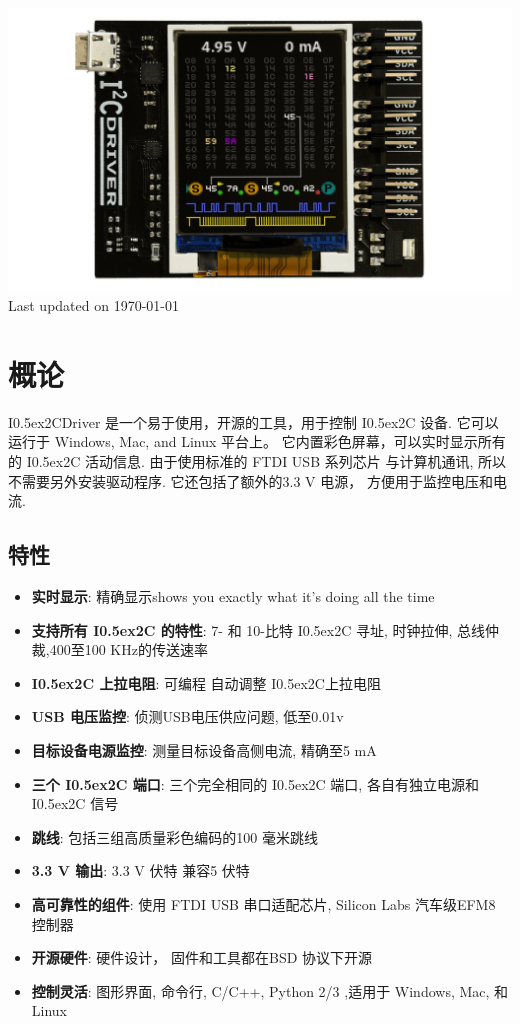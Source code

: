 \documentclass{article}
\newcommand{\two}{\raise0.5ex\hbox{\footnotesize{2}}}
\newcommand{\iic}{I\two{}C}
\newcommand{\iicdriver}{I\two{}CDriver}
\begin{document}
\newpage
\begin{center}
\includegraphics[width=1.00\textwidth]{img/i2cdriver/hero}
Last updated on \today
\end{center}
\tableofcontents

\newpage

\setlength{\parindent}{0mm}
\setlength{\parskip}{1mm}

\section{概论}

\iicdriver{} 是一个易于使用，开源的工具，用于控制 \iic{} 设备. 它可以运行于 Windows, Mac, and Linux 平台上。 它内置彩色屏幕，可以实时显示所有的 \iic{} 活动信息. 由于使用标准的 FTDI USB 系列芯片 与计算机通讯,  所以不需要另外安装驱动程序.  它还包括了额外的3.3 V 电源， 方便用于监控电压和电流.

\subsection{特性}
\begin{itemize}
\item \textbf{实时显示}: 精确显示shows you exactly what it's doing all the time  
\item \textbf{支持所有 \iic{} 的特性}: 7- 和 10-比特 \iic{} 寻址, 时钟拉伸, 总线仲裁,400至100 KHz的传送速率
\item \textbf{\iic{} 上拉电阻}: 可编程 自动调整 \iic{}上拉电阻  
\item \textbf{USB 电压监控}: 侦测USB电压供应问题, 低至0.01v  
\item \textbf{目标设备电源监控}: 测量目标设备高侧电流, 精确至5 mA  
\item \textbf{三个 \iic{} 端口}: 三个完全相同的 \iic{} 端口, 各自有独立电源和 \iic{} 信号
\item \textbf{跳线}: 包括三组高质量彩色编码的100 毫米跳线
\item \textbf{3.3 V 输出}: 3.3 V 伏特  兼容5 伏特 
\item \textbf{高可靠性的组件}: 使用 FTDI USB 串口适配芯片, Silicon Labs 汽车级EFM8 控制器
\item \textbf{开源硬件}: 硬件设计， 固件和工具都在BSD 协议下开源 
\item \textbf{控制灵活}: 图形界面, 命令行, C/C++, Python 2/3 ,适用于 Windows, Mac, 和 Linux  
\end{itemize}
\end{document}
